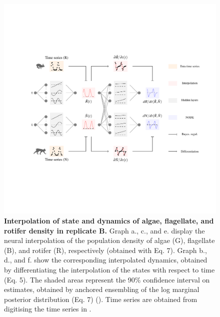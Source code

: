 \documentclass[11pt, oneside]{article}
\begin{document}
\begin{figure}[H]
\includegraphics[width=1\linewidth,page=17]{figures/main.pdf}
\caption{
    \textbf{Interpolation of state and dynamics of algae, flagellate, and rotifer density in replicate B.}
    Graph a., c., and e. display the neural interpolation of the population density of algae (G), flagellate (B), and rotifer (R), respectively (obtained with Eq. 7). 
    Graph b., d., and f. show the corresponding interpolated dynamics, obtained by differentiating the interpolation of the states with respect to time (Eq. 5).
    The shaded areas represent the 90\% confidence interval on estimates, obtained by anchored ensembling of the log marginal posterior distribution (Eq. 7) (\cite{Pearce2018}).
    Time series are obtained from digitising the time series in \cite{Hiltunen2013}.
}
\end{figure}
\newpage
\end{document}
